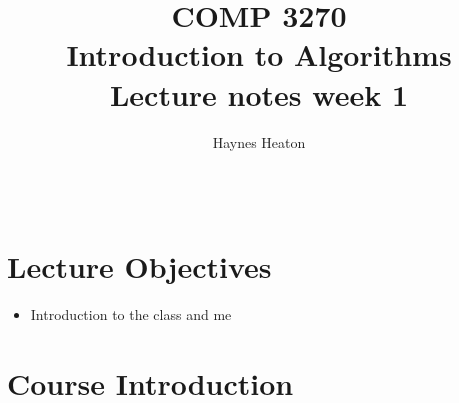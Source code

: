 \documentclass{article}\usepackage[]{graphicx}\usepackage[]{xcolor}
\newcommand{\blankline}{\quad\pagebreak[2]}
\begin{document}
\title{COMP 3270 \\ Introduction to Algorithms \\ Lecture notes week 1}
\author{Haynes Heaton}


\maketitle
\blankline

\begin{tabular*}{.93\textwidth}{@{\extracolsep{\fill}}lr}



\hline
\end{tabular*}


\section*{Lecture Objectives}
\begin{itemize}
\item Introduction to the class and me

\end{itemize}

\section*{Course Introduction}
\end{document}
